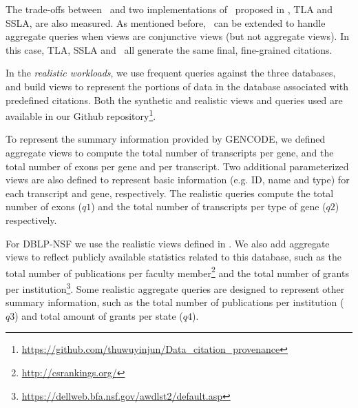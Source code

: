 The trade-offs between \provalg\ and two implementations of  \rba\ proposed in \cite{wu2018data}, TLA and SSLA, are also  measured. 
As mentioned before, \rba\ can be extended to handle aggregate queries when views are conjunctive views (but not aggregate views). In this case, TLA, SSLA and \provalg\ all generate the same final, fine-grained citations.


In the {\em realistic workloads}, we use frequent queries against the three databases, and build views to represent the portions of data in the database associated with predefined citations. Both the synthetic and realistic views and queries used are available in our Github repository\footnote{\url{https://github.com/thuwuyinjun/Data_citation_provenance}}. 

To represent the summary information provided by GENCODE, we defined aggregate views to compute the total number of transcripts per gene, and the total number of exons per gene and per transcript. Two additional parameterized views are also defined to represent basic information (e.g. ID, name and type) for each transcript and gene, respectively. The realistic queries  compute the total number of exons ($q1$) and the total number of transcripts per type of gene ($q2$) respectively.

For DBLP-NSF we use the realistic views defined in \cite{wu2018data}. We also add aggregate views to reflect publicly available statistics related to this database, such as the total number of publications per faculty member\footnote{\url{http://csrankings.org/}} and the total number of grants per institution\footnote{\url{https://dellweb.bfa.nsf.gov/awdlst2/default.asp}}. Some realistic aggregate queries are designed to represent other summary information, such as the total number of publications per institution ($q3$) and total amount of grants per state ($q4$).

